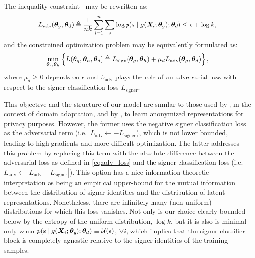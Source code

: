 The inequality constraint~ may be rewritten as:
\begin{equation}
    \label{eq:adv_loss}
    L_{\text{adv}}({\bm{\theta}}_g, {\bm{\theta}}_d) \triangleq \frac{1}{nk}\sum_{i=1}^n \sum_{{\textnormal{s}}} \log p({\textnormal{s}} \mid g({\bm{X}}_{i}; {\bm{\theta}}_g); {\bm{\theta}}_d) \leq \epsilon + \log k,
\end{equation}
and the constrained optimization problem may be equivalently formulated as:
\begin{equation}
    \label{eq:tr_obj}
    \min_{{\bm{\theta}}_g, {\bm{\theta}}_h}  \left\lbrace L({\bm{\theta}}_g, {\bm{\theta}}_h, {\bm{\theta}}_d) \triangleq L_{\text{sign}}({\bm{\theta}}_g, {\bm{\theta}}_h) + \mu_d L_{\text{adv}}({\bm{\theta}}_g, {\bm{\theta}}_d) \right\rbrace,
\end{equation}
where $\mu_d \geq 0$ depends on $\epsilon$ and $L_{\text{adv}}$ plays the role of an adversarial loss with respect to the signer classification loss $L_{\text{signer}}$.

This objective and the structure of our model are similar to those used by \citet{Ganin2015}, in the context of domain adaptation, and by \citet{Feutry2018}, to learn anonymized representations for privacy purposes. However, the former uses the negative signer classification loss as the adversarial term (i.e.\ $L_{\text{adv}} \leftarrow -L_{\text{signer}}$), which is not lower bounded, leading to high gradients and more difficult optimization. The latter addresses this problem by replacing this term with the absolute difference between the adversarial loss as defined in \eqref{eq:adv_loss} and the signer classification loss (i.e.\ $L_{\text{adv}} \leftarrow |L_{\text{adv}} - L_{\text{signer}}|$). This option has a nice information-theoretic interpretation as being an empirical upper-bound for the mutual information between the distribution of signer identities and the distribution of latent representations. Nonetheless, there are infinitely many (non-uniform) distributions for which this loss vanishes. Not only is our choice clearly bounded below by the entropy of the uniform distribution, $\log k$, but it is also is minimal only when $p({\textnormal{s}} \mid g({\bm{X}}_{i}; {\bm{\theta}}_g); {\bm{\theta}}_d) \equiv {\mathcal{U}}({\textnormal{s}})$, $\forall i$, which implies that the signer-classifier block is completely agnostic relative to the signer identities of the training samples.

